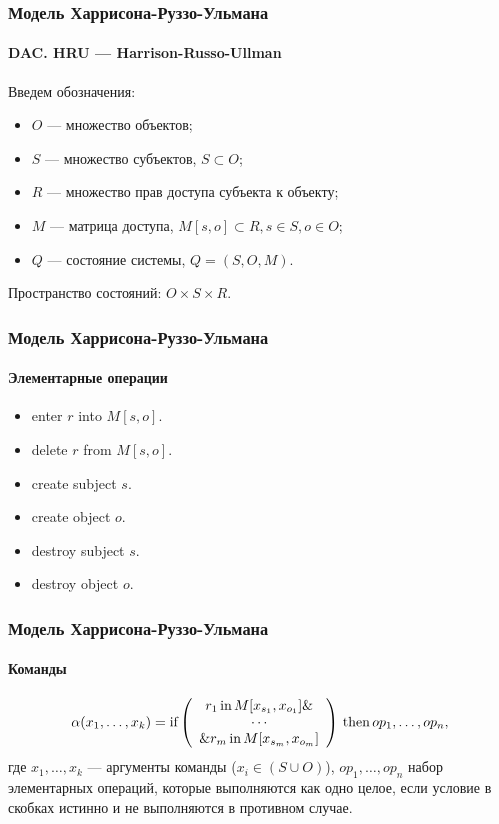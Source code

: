 \begin{frame}
    \frametitle{Модель Харрисона-Руззо-Ульмана}
    \framesubtitle{DAC. HRU --- Harrison-Russo-Ullman}
    
    Введем обозначения:
    \begin{itemize}
        \item $O$ --- множество объектов;
        \item $S$ --- множество субъектов, $S\subset O$;
        \item $R$ --- множество прав доступа субъекта к объекту;
        \item $M$ --- матрица доступа, $M[s,o]\subset R, s\in S, o\in O$;
        \item $Q$ --- состояние системы, $Q=(S, O, M)$.
    \end{itemize}
    Пространство состояний: $O\times S\times R$.
\end{frame}


\begin{frame}
    \frametitle{Модель Харрисона-Руззо-Ульмана}
    \framesubtitle{Элементарные операции}
    
    \begin{itemize}
        \item enter $r$ into $M[s, o]$. 
        \item delete $r$ from $M[s, o]$. 
        \item create subject $s$. 
        \item create object $o$. 
        \item destroy subject $s$. 
        \item destroy object $o$. 
    \end{itemize}
\end{frame}


\begin{frame}
    \frametitle{Модель Харрисона-Руззо-Ульмана}
    \framesubtitle{Команды}
    
    \[
        \alpha(x_1,\ldots,x_k)=
        \text{if}
        \left(
            \begin{array}[c]{c}
                r_1 \text{\,in\,} M[x_{s_1},x_{o_1}] \& \\
                \cdots \\
                \& r_m \text{\,in\,} M[x_{s_m},x_{o_m}]
            \end{array}
        \right)
        \text{\,then\,} op_1,\ldots,op_n,
    \]
    где $x_1,\ldots,x_k$ --- аргументы команды ($x_i\in(S\cup O)$), $op_1,\ldots,op_n$ набор элементарных операций,
    которые выполняются как одно целое, если условие в скобках истинно и не выполняются в противном случае.
\end{frame}


